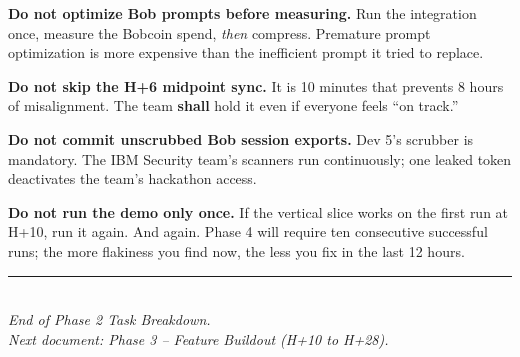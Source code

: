 \documentclass[11pt,letterpaper]{article}
\newcommand{\shall}{\textbf{shall}}
\begin{document}
\begin{warning}
\textbf{Do not optimize Bob prompts before measuring.} Run the integration once, measure the Bobcoin spend, \textit{then} compress. Premature prompt optimization is more expensive than the inefficient prompt it tried to replace.
\end{warning}

\begin{warning}
\textbf{Do not skip the H+6 midpoint sync.} It is 10 minutes that prevents 8 hours of misalignment. The team \shall{} hold it even if everyone feels ``on track.''
\end{warning}

\begin{warning}
\textbf{Do not commit unscrubbed Bob session exports.} Dev 5's scrubber is mandatory. The IBM Security team's scanners run continuously; one leaked token deactivates the team's hackathon access.
\end{warning}

\begin{warning}
\textbf{Do not run the demo only once.} If the vertical slice works on the first run at H+10, run it again. And again. Phase 4 will require ten consecutive successful runs; the more flakiness you find now, the less you fix in the last 12 hours.
\end{warning}

\vfill

\begin{center}
\rule{0.6\textwidth}{0.6pt}\\
\vspace{0.3em}
{\small\itshape\color{ibmgray} End of Phase 2 Task Breakdown.\\}
{\small\itshape\color{ibmgray} Next document: Phase 3 -- Feature Buildout (H+10 to H+28).}
\end{center}
\end{document}
